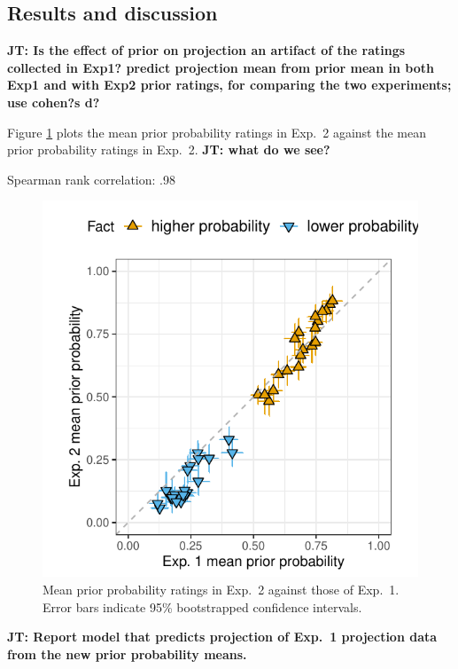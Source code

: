 \documentclass[11pt,fleqn]{article}
\newcommand{\6}{\mbox{$[\hspace*{-.6mm}[$}}
\newcommand{\9}{\mbox{$]\hspace*{-.6mm}]$}}
\newcommand{\jt}[1]{\textbf{\color{blue}JT: #1}}
\begin{document}
\subsection{Results and discussion}

\jt{Is the effect of prior on projection an artifact of the ratings collected in Exp1? predict projection mean from prior mean in both Exp1 and with Exp2 prior ratings, for comparing the two experiments; use cohen?s d?}

Figure \ref{f-prior-comparison} plots the mean prior probability ratings in Exp.~2 against the mean prior probability ratings in Exp.~2.  \jt{what do we see?}

Spearman rank correlation: .98

\begin{figure}[H]
\centering

\includegraphics[width=.5\paperwidth]{../../results/1-prior/graphs/prior-probability-comparison-exp1-exp2}

\caption{Mean prior probability ratings in Exp.~2 against those of Exp.~1. Error bars indicate 95\% bootstrapped confidence intervals.}
\label{f-prior-comparison}
\end{figure}

\jt{Report model that predicts projection of Exp.~1 projection data from the new prior probability means.}
\end{document}
